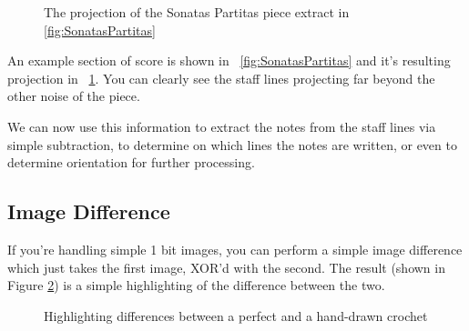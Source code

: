 \begin{figure}[h!]
  \centering
  \caption{The projection of the Sonatas Partitas piece extract in \ref{fig:SonatasPartitas}}
  \label{fig:SonatasPartitasProjection}
\end{figure}

An example section of score is shown in ~\ref{fig:SonatasPartitas} and it's resulting projection in ~\ref{fig:SonatasPartitasProjection}. You can clearly see the staff lines projecting far beyond the other noise of the piece.

We can now use this information to extract the notes from the staff lines via simple subtraction, to determine on which lines the notes are written, or even to determine orientation for further processing.

\subsection{Image Difference}

If you're handling simple 1 bit images, you can perform a simple image difference which just takes the first image, XOR'd with the second. The result (shown in Figure \ref{fig:CrochetDiff}) is a simple highlighting of the difference between the two.

\begin{figure}[h!]
  \centering
  \caption{Highlighting differences between a perfect and a hand-drawn crochet}
  \label{fig:CrochetDiff}
\end{figure}

